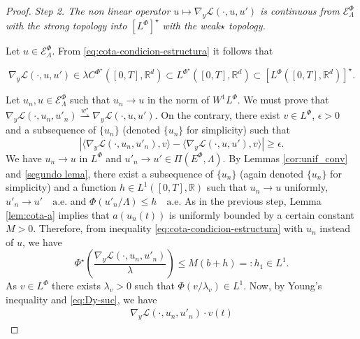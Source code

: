 \documentclass[twoside]{article}
\theoremstyle{remark}
\newcommand{\lphi}{L^{\Phi}}
\newcommand{\lpsi}{L^{\Phi^{\star}}}
\newcommand{\ephi}{E^{\Phi}}
\newcommand{\wphi}{W^{1}\lphi}
\newcommand{\domi}{\mathcal{E}^{\Phi}}
\newcommand{\rr}{\mathbb{R}}
\renewcommand{\leq}{\leqslant}
\renewcommand{\geq}{\geqslant}
\begin{document}
\begin{proof}
\noindent\emph{Step 2. The non linear operator   $u
 \mapsto  \nabla_y\mathcal{L}(\cdot,u,u')$ is continuous from $\domi_{\Lambda}$ with the strong topology  
into $\left[\lphi\right]^{\star}$  with the weak$\star$ topology.}

 Let $u\in \domi_{\Lambda}$.  From  \eqref{eq:cota-condicion-estructura} it follows that 

\begin{equation}\label{eq:DyLpsi-clase}
\nabla_y\mathcal{L}(\cdot,u,u')\in \lambda C^{\Phi^{\star}}\left([0,T],\rr^d\right)\subset\lpsi\left([0,T],\rr^d\right)\subset\left[\lphi\left([0,T],\rr^d\right)\right]^{\star}.
\end{equation}






Let $u_n,u\in \domi_{\Lambda}$ such that $u_n\to u$ in the norm of $\wphi$. 
We must prove that  $\nabla_y\mathcal{L}(\cdot,u_n,u'_n)\overset{w^\star}{\rightharpoonup} 
\nabla_y\mathcal{L}(\cdot,u,u')$. 
On the contrary, there exist $v\in\lphi$, $\epsilon>0$ and a subsequence of $\{u_n\}$ (denoted  $\{u_n\}$ for simplicity)  such that
\begin{equation}\label{cota_eps}
 \left| \langle \nabla_y\mathcal{L}(\cdot,u_n,u'_n),v \rangle - 
\langle  \nabla_y\mathcal{L}(\cdot,u,u'),v \rangle\right|\geq \epsilon.
\end{equation}
We have $u_n\rightarrow u$ in $\lphi$ and
$u'_n\rightarrow u'\in\Pi(\ephi,\Lambda)$.
 By Lemmas \ref{cor:unif_conv}  and \ref{segundo lema}, there exist a subsequence of $\{u_n\}$ (again denoted  $\{u_n\}$ for simplicity) 
and a function $h\in L^1([0,T],\rr)$ such that 
$u_n\rightarrow u$ uniformly, $u'_n\rightarrow u' \quad\text{a.e.}$ and $\Phi(u'_n/\Lambda)\leq h\quad\text{a.e.}$ 
As in the previous step,
Lemma \ref{lem:cota-a} implies that $a(u_n(t))$ is uniformly bounded by a certain constant $M>0$. 
Therefore,   from inequality  \eqref{eq:cota-condicion-estructura} with $u_n$ instead of $u$, we have 
\begin{equation}\label{eq:Dy-suc}
  \Phi^{\star}\left(\frac{\nabla_y\mathcal{L}(\cdot,u_n,u'_n)}{\lambda}\right)   
	\leq M (b+h)=:h_1\in L^1.
\end{equation}
As $v \in \lphi$ there exists $\lambda_v>0$ such that $\Phi(v/\lambda_v)\in L^1$. 
Now, by Young's inequality and \eqref{eq:Dy-suc}, we have
\begin{equation}\label{eq:Dy_lambda-Psi}
\begin{split}
\nabla_y\mathcal{L}(\cdot,u_{n},u'_{n})\cdot v(t)

\end{split}
\end{equation}
\end{proof}
\end{document}
